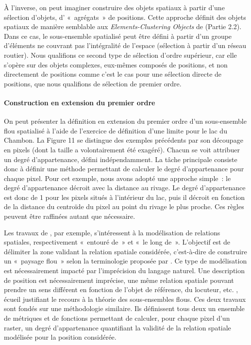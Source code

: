 À l’inverse, on peut imaginer construire des objets spatiaux à partir
d’une sélection d’objets, d’ « agrégats » \autocite{Charrre1995} de
positions. Cette approche définit des objets spatiaux de manière
semblable aux\emph{ Elements-Clustering Objects} de \textcite{Liu2019}
(Partie 2.2). Dans ce cas, le sous-ensemble spatialisé peut être
défini à partir d’un groupe d’éléments ne couvrant pas l’intégralité
de l’espace (\eg sélection à partir d’un réseau routier). Nous
qualifions ce second type de sélection d’ordre supérieur, car elle
s’opère sur des objets complexes, eux-mêmes composés de positions, et
non directement de positions comme c’est le cas pour une sélection
directe de positions, que nous qualifions de sélection de premier
ordre.

\paragraph{Construction en extension du premier ordre}

On peut présenter la définition en extension du premier ordre d’un
sous-ensemble flou spatialisé à l’aide de l’exercice de définition
d’une limite pour le lac du Chambon. La Figure 11 se distingue des
exemples précédents par son découpage en pixels (dont la taille a
volontairement été exagéré). Chacun se voit attribuer un degré
d’appartenance, défini indépendamment. La tâche principale consiste
donc à définir une méthode permettant de calculer le degré
d’appartenance pour chaque pixel. Pour cet exemple, nous avons adopté
une approche simple : le degré d’appartenance décroit avec la distance
au rivage. Le degré d’appartenance est donc de 1 pour les pixels
situés à l’intérieur du lac, puis il décroit en fonction de la
distance du centroïde du pixel au point du rivage le plus proche. Ces
règles peuvent être raffinées autant que nécessaire.

Les travaux de \textcite{Vanegass2011,Takemura2012}, par exemple,
s’intéressent à la modélisation de relations spatiales, respectivement
« entouré de » et « le long de ». L’objectif est de délimiter la zone
validant la relation spatiale considérée, c’est-à-dire de construire
un « paysage flou » selon la terminologie proposée par
\textcite{Bloch1996}. Ce type de modélisation est nécessairement
impacté par l’imprécision du langage naturel. Une description de
position est nécessairement imprécise, une même relation spatiale
pouvant prendre un sens différent en fonction de l’objet de référence,
du locuteur, etc. \autocite{Vandeloise1986,Borillo1998,Bateman2010},
écueil justifiant le recours à la théorie des sous-ensembles
flous. Ces deux travaux sont fondés sur une méthodologie
similaire. Ils définissent tous deux un ensemble de métriques et de
fonctions permettant de calculer, pour chaque pixel d’un raster, un
degré d’appartenance quantifiant la validité de la relation spatiale
modélisée pour la position considérée.

